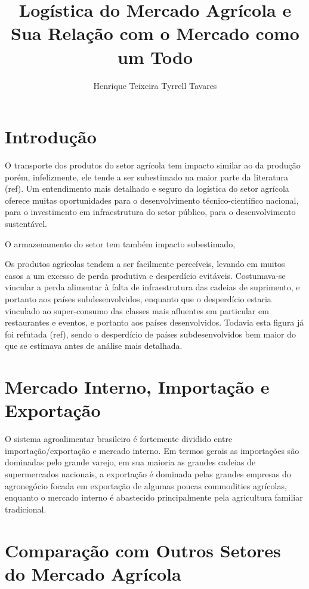 \documentclass[]{article}
\title{Logística do Mercado Agrícola e Sua Relação com o Mercado como um Todo}
\author{Henrique Teixeira Tyrrell Tavares}
\begin{document}
	
	\maketitle
	
	\begin{abstract}
		
	\end{abstract}
	
	\section{Introdução}

		O transporte dos produtos do setor agrícola tem impacto similar ao da produção porém, infelizmente, ele tende a ser subestimado na maior parte da literatura (ref). Um entendimento mais detalhado e seguro da logística do setor agrícola oferece muitas oportunidades para o desenvolvimento técnico-científico nacional, para o investimento em infraestrutura do setor público, para o desenvolvimento sustentável.
		
		O armazenamento do setor tem também impacto subestimado, 
		
		Os produtos agrícolas tendem a ser facilmente perecíveis, levando em muitos casos a um excesso de perda produtiva e desperdício evitáveis. Costumava-se vincular a perda alimentar à falta de infraestrutura das cadeias de suprimento, e portanto aos países subdesenvolvidos, enquanto que o desperdício estaria vinculado ao super-consumo das classes mais afluentes em particular em restaurantes e eventos, e portanto aos países desenvolvidos. Todavia esta figura já foi refutada (ref), sendo o desperdício de países subdesenvolvidos bem maior do que se estimava antes de análise mais detalhada. 
	
	\section{Mercado Interno, Importação e Exportação}
	
		O sistema agroalimentar brasileiro é fortemente dividido entre importação/exportação e mercado interno. Em termos gerais as importações são dominadas pelo grande varejo, em sua maioria as grandes cadeias de supermercados nacionais, a exportação é dominada pelas grandes empresas do agronegócio focada em exportação de algumas poucas commodities agrícolas, enquanto o mercado interno é abastecido principalmente pela agricultura familiar tradicional. 
	

	\section{Comparação com Outros Setores do Mercado Agrícola}
\end{document}
